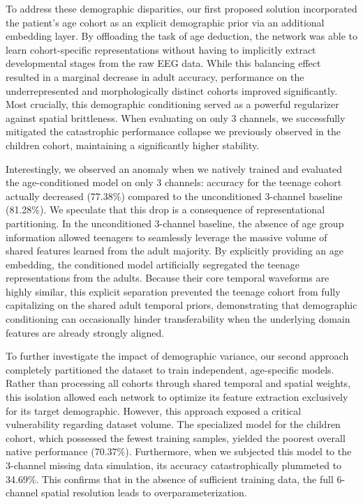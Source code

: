 To address these demographic disparities, our first proposed solution 
incorporated the patient's age cohort as an explicit demographic prior 
via an additional embedding layer. By offloading the task of age deduction,
the network was able to learn cohort-specific representations without having
to implicitly extract developmental stages from the raw EEG data. 
While this balancing effect resulted in a marginal decrease in adult accuracy,
performance on the underrepresented and morphologically distinct cohorts improved significantly.
Most crucially, this demographic conditioning served as a powerful 
regularizer against spatial brittleness. When evaluating on only 3 channels,
we successfully mitigated the catastrophic performance collapse we previously observed in the children cohort,
maintaining a significantly higher stability.

Interestingly, we observed an anomaly when we natively trained and evaluated the age-conditioned model
on only 3 channels: accuracy for 
the teenage cohort actually decreased (77.38\%) compared to the 
unconditioned 3-channel baseline (81.28\%). We speculate that this 
drop is a consequence of representational partitioning. In the unconditioned 
3-channel baseline, the absence of age group information allowed teenagers 
to seamlessly leverage the massive volume of shared features learned from the 
adult majority. By explicitly providing an age embedding, the conditioned model 
artificially segregated the teenage representations from the adults. 
Because their core temporal waveforms are highly similar, this 
explicit separation prevented the teenage cohort from fully capitalizing
on the shared adult temporal priors, demonstrating that demographic conditioning 
can occasionally hinder transferability when the underlying domain features are 
already strongly aligned.

To further investigate the impact of demographic variance, our second approach
completely partitioned the dataset to train independent, age-specific models.
Rather than processing all cohorts through shared temporal and spatial weights,
this isolation allowed each network to optimize its feature extraction exclusively
for its target demographic. However, this approach exposed a critical vulnerability
regarding dataset volume. The specialized model for the children cohort, which
possessed the fewest training samples, yielded the poorest overall native
performance (70.37\%). Furthermore, when we subjected this model to the 3-channel missing data
simulation, its accuracy catastrophically plummeted to 34.69\%. This
confirms that in the absence of sufficient training data, the full 6-channel
spatial resolution leads to overparameterization.

